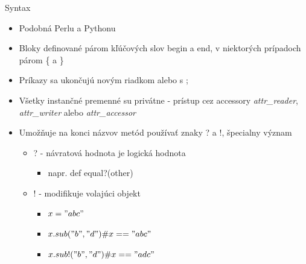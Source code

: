 \documentclass[pdf,slideColor,fyma]{prosper}
\begin{document}
\begin{slide}{Syntax}
\begin{itemize}
  \item{Podobná Perlu a Pythonu}
  \item{Bloky definované párom kľúčových slov begin a end, v niektorých prípadoch párom \{ a \}}
  \item{Príkazy sa ukončujú novým riadkom alebo s ;}
  \item{Všetky instančné premenné su privátne - prístup cez accessory \textit{attr\_reader}, \textit{attr\_writer} alebo \textit{attr\_accessor}}
  \item{Umožňuje na konci názvov metód používať znaky ? a !, špecialny význam}
    \begin{itemize}
        \item{? - návratová hodnota je logická hodnota}
          \begin{itemize}
            \item{napr. def equal?(other)}
          \end{itemize}
        \item{! - modifikuje volajúci objekt}
          \begin{itemize}
            \item{$x = "abc"$}
            \item{$x.sub("b", "d") \# x == "abc"$}
            \item{$x.sub!("b", "d") \# x == "adc"$}
          \end{itemize}
     \end{itemize}
\end{itemize}
\end{slide}
\end{document}
